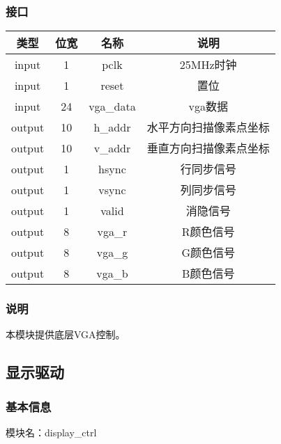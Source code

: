 \subsubsection{接口}
\begin{tabular}{|c|c|c|c|}
    \hline
    类型    &   位宽    &   名称    &   说明\\\hline
    input   &   1   &   pclk &   25MHz时钟\\\hline
    input   &   1   &   reset  &   置位\\\hline
    input   &   24   &   vga\_data  &   vga数据\\\hline
    output   &   10   &   h\_addr  &   水平方向扫描像素点坐标\\\hline
    output   &   10   &   v\_addr  &   垂直方向扫描像素点坐标\\\hline
    output   &   1   &   hsync  &   行同步信号\\\hline
    output   &   1   &   vsync  &   列同步信号\\\hline
    output   &   1   &   valid  &   消隐信号\\\hline
    output   &   8   &   vga\_r  &   R颜色信号\\\hline
    output   &   8   &   vga\_g  &   G颜色信号\\\hline
    output   &   8   &   vga\_b  &   B颜色信号\\\hline
\end{tabular}
\subsubsection{说明}
本模块提供底层VGA控制。
\subsection{显示驱动}
\subsubsection{基本信息}
模块名：display\_ctrl
